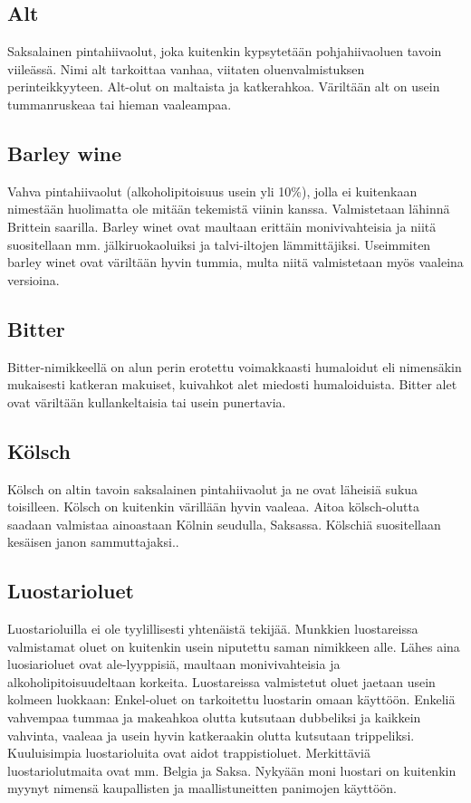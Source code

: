 \documentclass[a4paper,11pt]{report}
\begin{document}
\subsection*{Alt}

Saksalainen pintahiivaolut, joka kuitenkin kypsytetään pohjahiivaoluen tavoin viileässä. Nimi alt tarkoittaa vanhaa, viitaten oluenvalmistuksen perinteikkyyteen. Alt-olut on maltaista ja katkerahkoa. Väriltään alt on usein tummanruskeaa tai hieman vaaleampaa.

\subsection*{Barley wine}

Vahva pintahiivaolut (alkoholipitoisuus usein yli 10\%), jolla ei kuitenkaan nimestään huolimatta ole mitään tekemistä viinin kanssa. Valmistetaan lähinnä Brittein saarilla. Barley winet ovat maultaan erittäin monivivahteisia ja niitä suositellaan mm. jälkiruokaoluiksi ja talvi-iltojen lämmittäjiksi. Useimmiten barley winet ovat väriltään hyvin tummia, multa niitä valmistetaan myös vaaleina versioina.

\subsection*{Bitter}

Bitter-nimikkeellä on alun perin erotettu voimakkaasti humaloidut eli nimensäkin mukaisesti katkeran makuiset, kuivahkot alet miedosti humaloiduista. Bitter alet ovat väriltään kullankeltaisia tai usein punertavia.

\subsection*{Kölsch}

Kölsch on altin tavoin saksalainen pintahiivaolut ja ne ovat läheisiä sukua toisilleen. Kölsch on kuitenkin värillään hyvin vaaleaa. Aitoa kölsch-olutta saadaan valmistaa ainoastaan Kölnin seudulla, Saksassa. Kölschiä suositellaan kesäisen janon sammuttajaksi..

\subsection*{Luostarioluet}

Luostarioluilla ei ole tyylillisesti yhtenäistä tekijää. Munkkien luostareissa valmistamat oluet on kuitenkin usein niputettu saman nimikkeen alle. Lähes aina luosiarioluet ovat ale-lyyppisiä, maultaan monivivahteisia ja alkoholipitoisuudeltaan korkeita. Luostareissa valmistetut oluet jaetaan usein kolmeen luokkaan: Enkel-oluet on tarkoitettu luostarin omaan käyttöön. Enkeliä vahvempaa tummaa ja makeahkoa olutta kutsutaan dubbeliksi ja kaikkein vahvinta, vaaleaa ja usein hyvin katkeraakin olutta kutsutaan trippeliksi. Kuuluisimpia luostarioluita ovat aidot trappistioluet. Merkittäviä luostariolutmaita ovat mm. Belgia ja Saksa. Nykyään moni luostari on kuitenkin myynyt nimensä kaupallisten ja maallistuneitten panimojen käyttöön.
\end{document}
